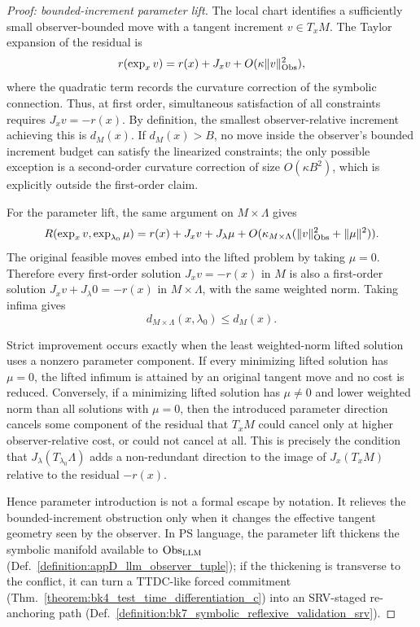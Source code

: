 \begin{proof}[Proof: bounded-increment parameter lift]
\label{proof:appD_bounded_increment_parameter_lift}
The local chart identifies a sufficiently small observer-bounded move with a
tangent increment \(v\in T_xM\). The Taylor expansion of the residual is
\[
    r(\exp_x v)
    =
    r(x)+J_xv+O(\kappa\|v\|_{\mathrm{Obs}}^{2}),
\]
where the quadratic term records the curvature correction of the symbolic
connection. Thus, at first order, simultaneous satisfaction of all constraints
requires \(J_xv=-r(x)\). By definition, the smallest observer-relative
increment achieving this is \(d_M(x)\). If \(d_M(x)>B\), no move inside the
observer's bounded increment budget can satisfy the linearized constraints; the
only possible exception is a second-order curvature correction of size
\(O(\kappa B^{2})\), which is explicitly outside the first-order claim.

For the parameter lift, the same argument on \(M\times\Lambda\) gives
\[
    R(\exp_x v,\exp_{\lambda_0}\mu)
    =
    r(x)+J_xv+J_{\lambda}\mu
    +O(\kappa_{M\times\Lambda}(\|v\|_{\mathrm{Obs}}^{2}+\|\mu\|^{2})).
\]
The original feasible moves embed into the lifted problem by taking
\(\mu=0\). Therefore every first-order solution \(J_xv=-r(x)\) in \(M\) is also
a first-order solution \(J_xv+J_{\lambda}0=-r(x)\) in \(M\times\Lambda\), with
the same weighted norm. Taking infima gives
\[
    d_{M\times\Lambda}(x,\lambda_0)\leq d_M(x).
\]

Strict improvement occurs exactly when the least weighted-norm lifted solution
uses a nonzero parameter component. If every minimizing lifted solution has
\(\mu=0\), the lifted infimum is attained by an original tangent move and no
cost is reduced. Conversely, if a minimizing lifted solution has \(\mu\neq0\)
and lower weighted norm than all solutions with \(\mu=0\), then the introduced
parameter direction cancels some component of the residual that \(T_xM\) could
cancel only at higher observer-relative cost, or could not cancel at all. This
is precisely the condition that \(J_{\lambda}(T_{\lambda_0}\Lambda)\) adds a
non-redundant direction to the image of \(J_x(T_xM)\) relative to the residual
\(-r(x)\).

Hence parameter introduction is not a formal escape by notation. It relieves
the bounded-increment obstruction only when it changes the effective tangent
geometry seen by the observer. In PS language, the parameter lift thickens the
symbolic manifold available to \(\mathrm{Obs}_{\mathrm{LLM}}\)
(Def.~\ref{definition:appD_llm_observer_tuple}); if the thickening is
transverse to the conflict, it can turn a TTDC-like forced commitment
(Thm.~\ref{theorem:bk4_test_time_differentiation_c}) into an SRV-staged
re-anchoring path (Def.~\ref{definition:bk7_symbolic_reflexive_validation_srv}).
\end{proof}

